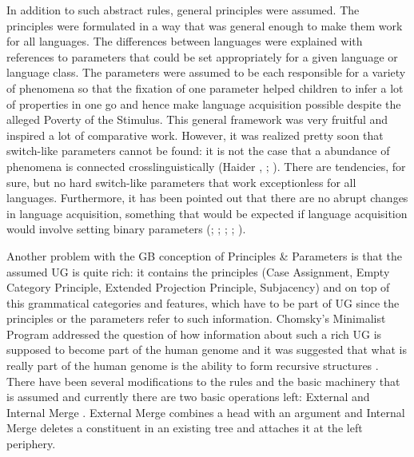 \zl
In addition to such abstract rules, general principles were assumed. The principles were formulated
in a way that was general enough to make them work for all languages. The differences between
languages were explained with references to parameters that could be set appropriately for a given
language or language class. The parameters were assumed to be each responsible for a variety of
phenomena so that the fixation of one parameter helped children to infer a lot of properties in one
go and hence make language acquisition possible despite the alleged Poverty of the Stimulus.
This general framework was very fruitful and inspired a lot of comparative work. However, it was
realized pretty soon that switch-like parameters cannot be found: it is not the case that a abundance of
phenomena is connected crosslinguistically (Haider \citeyear{Haider94c-u}, \citeyear[Section~2.2]{Haider2001a}; \citealp[Section~16.1]{MuellerGT-Eng1}). There are tendencies, for sure, but no hard switch-like
parameters that work exceptionless for all languages. Furthermore, it has been pointed out that there
are no abrupt changes in language acquisition, something that would be expected if language
acquisition would involve setting binary parameters (\citealp[]{Bloom93a}; \citealp[]{Haider93a}; \citealp[]{Abney96a}; \citealp[Section~9.1]{AW98a};
\citealp{Tomasello2000a,Tomasello2003a}). 

Another problem with the GB conception of Principles \& Parameters is that the assumed UG is quite
rich: it contains the principles (Case Assignment, Empty Category Principle, Extended Projection
Principle, Subjacency) and on top of this grammatical categories and features, which have to be part
of UG since the principles or the parameters refer to such information. Chomsky's Minimalist Program
addressed the question of how information about such a rich UG is supposed to become part of the
human genome and it was suggested that what is really part of the human genome is the ability to
form recursive structures \citep*{HCF2002a}. There have been several modifications to the rules and
the basic machinery that is assumed and currently there are two basic operations left: External and
Internal Merge \citep{Chomsky2001b-u}. External Merge combines a head with an argument and Internal Merge deletes a
constituent in an existing tree and attaches it at the left periphery.

